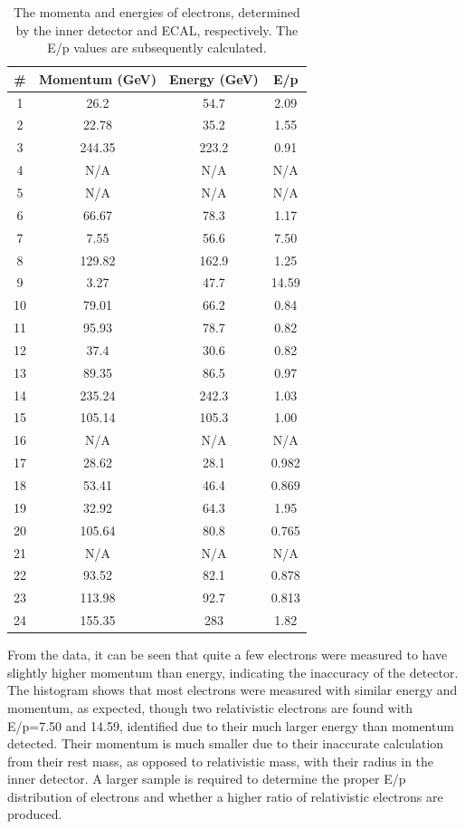 \documentclass[twocolumn]{article}
\begin{document}
\begin{table} [!h]
\centering
\begin{tabular}{|c|c|c|c|}
\hline
\# & Momentum (GeV) & Energy (GeV) & E/p\\
\hline
1&	26.2&		54.7&	2.09\\\hline
2&	22.78&		35.2&	1.55\\\hline
3&	244.35&		223.2&	0.91\\\hline
4&	N/A &		N/A&	N/A\\\hline
5&	N/A	&		N/A&	N/A\\\hline
6&	66.67&		78.3&	1.17\\\hline
7&	7.55&		56.6&	7.50\\\hline
8&	129.82&		162.9&	1.25\\\hline
9&	3.27&		47.7&	14.59\\\hline
10&	79.01&		66.2&	0.84\\\hline
11&	95.93&		78.7&	0.82\\\hline
12&	37.4&		30.6&	0.82\\\hline
13&	89.35&		86.5&	0.97\\\hline
14&	235.24&		242.3&	1.03\\\hline
15&	105.14&		105.3&	1.00\\\hline
16&	N/A	  &		N/A&	N/A\\\hline
17&	28.62&		28.1&	0.982\\\hline
18&	53.41&		46.4&	0.869\\\hline
19&	32.92&		64.3&	1.95\\\hline
20&	105.64&		80.8&	0.765\\\hline
21&	N/A	  &		N/A&	N/A\\\hline
22&	93.52&		82.1&	0.878\\\hline
23&	113.98&		92.7&	0.813\\\hline
24&	155.35&		283&	1.82\\\hline
\end{tabular}
\caption{The momenta and energies of electrons, determined by the inner detector and ECAL, respectively. The E/p values are subsequently calculated.}
\label{tab:electron}
\end{table}
From the data, it can be seen that quite a few electrons were measured to have slightly higher momentum than energy, indicating the inaccuracy of the detector. The histogram shows that most electrons were measured with similar energy and momentum, as expected, though two relativistic electrons are found with E/p=7.50 and 14.59, identified due to their much larger energy than momentum detected. Their momentum is much smaller due to their inaccurate calculation from their rest mass, as opposed to relativistic mass, with their radius in the inner detector. A larger sample is required to determine the proper E/p distribution of electrons and whether a higher ratio of relativistic electrons are produced.
\end{document}
